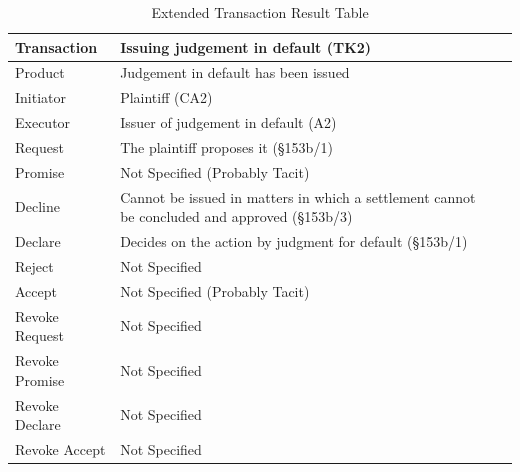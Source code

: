 \begin{landscape}
\begin{table}[h]
\caption{Extended Transaction Result Table}
\label{tab:etrt}
\begin{tabular}{|l||l|l|}
\hline
Transaction  & Issuing judgement in default (TK2) \\ \hline
Product  & Judgement in default has been issued \\ \hline
Initiator      &  Plaintiff (CA2)\\ \hline
Executor       &  Issuer of judgement in default (A2)      \\ \hline
Request        & The plaintiff proposes it (\S153b/1)   \\ \hline
Promise        &  Not Specified (Probably Tacit)   \\ \hline
Decline        &  Cannot be issued in matters in which a settlement cannot be concluded and approved (\S153b/3) \\ \hline
Declare        & Decides on the action by judgment for default (\S153b/1) \\ \hline
Reject         &  Not Specified   \\ \hline
Accept         &  Not Specified (Probably Tacit) \\ \hline
Revoke Request &  Not Specified        \\ \hline
Revoke Promise &  Not Specified       \\ \hline
Revoke Declare &  Not Specified      \\ \hline
Revoke Accept  &  Not Specified             \\ \hline
\end{tabular}
\end{table}


\end{landscape}

